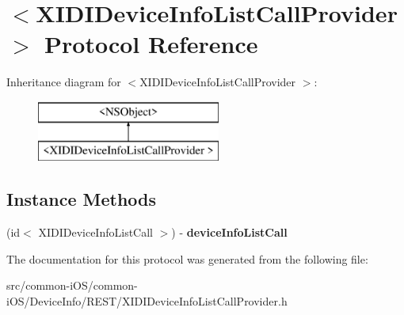 \hypertarget{protocol_x_i_d_i_device_info_list_call_provider_01-p}{}\section{$<$X\+I\+D\+I\+Device\+Info\+List\+Call\+Provider $>$ Protocol Reference}
\label{protocol_x_i_d_i_device_info_list_call_provider_01-p}
Inheritance diagram for $<$X\+I\+D\+I\+Device\+Info\+List\+Call\+Provider $>$\+:\begin{figure}[H]
\begin{center}
\leavevmode
\includegraphics[height=2.000000cm]{protocol_x_i_d_i_device_info_list_call_provider_01-p}
\end{center}
\end{figure}
\subsection*{Instance Methods}
\begin{DoxyCompactItemize}
\item 
\hypertarget{protocol_x_i_d_i_device_info_list_call_provider_01-p_acc21759224b8cdd0b2de7d14d076c564}{}\label{protocol_x_i_d_i_device_info_list_call_provider_01-p_acc21759224b8cdd0b2de7d14d076c564} 
(id$<$ X\+I\+D\+I\+Device\+Info\+List\+Call $>$) -\/ {\bfseries device\+Info\+List\+Call}
\end{DoxyCompactItemize}


The documentation for this protocol was generated from the following file\+:\begin{DoxyCompactItemize}
\item 
src/common-\/i\+O\+S/common-\/i\+O\+S/\+Device\+Info/\+R\+E\+S\+T/X\+I\+D\+I\+Device\+Info\+List\+Call\+Provider.\+h\end{DoxyCompactItemize}
